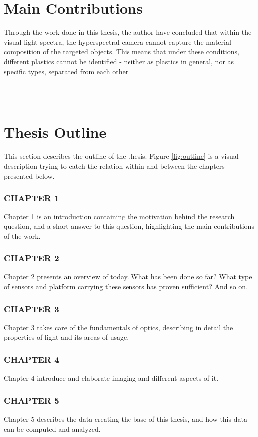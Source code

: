 \section{Main Contributions}
Through the work done in this thesis, the author have concluded that within the visual light spectra, the hyperspectral camera cannot capture the material composition of the targeted objects. This means that under these conditions, different plastics cannot be identified - neither as plastics in general, nor as specific types, separated from each other.

\\\\
\section{Thesis Outline}
This section describes the outline of the thesis. Figure \ref{fig:outline} is a visual description trying to catch the relation within and between the chapters presented below. 
\subsubsection*{CHAPTER 1} Chapter 1 is an introduction containing the motivation behind the research question, and a short answer to this question, highlighting the main contributions of the work. 
\subsubsection*{CHAPTER 2} Chapter 2 presents an overview of today. What has been done so far? What type of sensors and platform carrying these sensors has proven sufficient? And so on.
\subsubsection*{CHAPTER 3} Chapter 3 takes care of the fundamentals of optics, describing in detail the properties of light and its areas of usage.
\subsubsection*{CHAPTER 4} Chapter 4 introduce and elaborate imaging and different aspects of it.
\subsubsection*{CHAPTER 5} Chapter 5 describes the data creating the base of this thesis, and how this data can be computed and analyzed.
